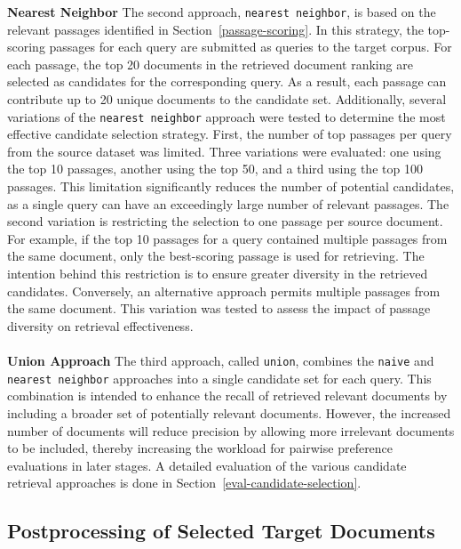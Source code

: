 \textbf{Nearest Neighbor} The second approach, \texttt{nearest neighbor}, is based on the relevant passages identified in Section~\ref{passage-scoring}. In this strategy, the top-scoring passages for each query are submitted as queries to the target corpus. For each passage, the top 20 documents in the retrieved document ranking are selected as candidates for the corresponding query. As a result, each passage can contribute up to 20 unique documents to the candidate set. Additionally, several variations of the \texttt{nearest neighbor} approach were tested to determine the most effective candidate selection strategy. First, the number of top passages per query from the source dataset was limited. Three variations were evaluated: one using the top 10 passages, another using the top 50, and a third using the top 100 passages. This limitation significantly reduces the number of potential candidates, as a single query can have an exceedingly large number of relevant passages. The second variation is restricting the selection to one passage per source document. For example, if the top 10 passages for a query contained multiple passages from the same document, only the best-scoring passage is used for retrieving. The intention behind this restriction is to ensure greater diversity in the retrieved candidates. Conversely, an alternative approach permits multiple passages from the same document. This variation was tested to assess the impact of passage diversity on retrieval effectiveness.
\\\\
\textbf{Union Approach} The third approach, called \texttt{union}, combines the \texttt{naive} and \texttt{nearest neighbor} approaches into a single candidate set for each query. This combination is intended to enhance the recall of retrieved relevant documents by including a broader set of potentially relevant documents. However, the increased number of documents will reduce precision by allowing more irrelevant documents to be included, thereby increasing the workload for pairwise preference evaluations in later stages. A detailed evaluation of the various candidate retrieval approaches is done in Section~\ref{eval-candidate-selection}.

\subsection{Postprocessing of Selected Target Documents}\label{postprocessing-of-selected-target-documents}


